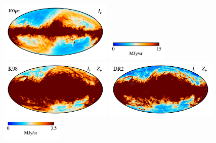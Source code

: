 \documentclass[twocolumn]{aa}
\begin{document}
\begin{figure}
    \centering
    \includegraphics[height=2.90cm]{figs/compare_freq_maps/cosmoglobe_ma_08.pdf}%
    \includegraphics[width=2.90cm,angle=90]{figs/compare_freq_maps/cbar_tot_08.pdf}%
    \includegraphics[height=2.90cm]{figs/compare_freq_maps/dirbe_zsma_08.pdf}%
    \includegraphics[height=2.90cm]{figs/compare_freq_maps/cosmoglobe_zsma_08.pdf}%
    \includegraphics[width=2.90cm,angle=90]{figs/compare_freq_maps/cbar_08.pdf}%
    \\


\end{figure}
\end{document}
